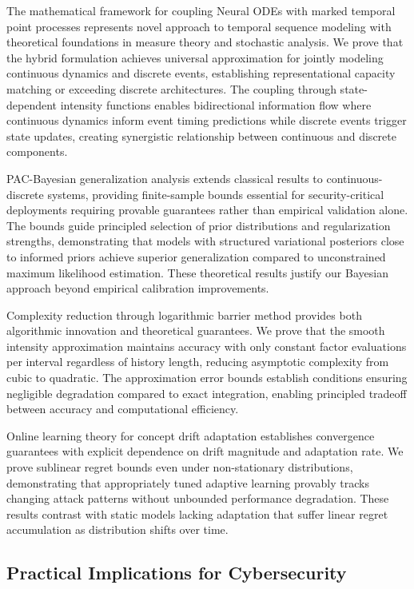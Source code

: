 \documentclass[10pt,journal,compsoc]{IEEEtran}
\begin{document}
The mathematical framework for coupling Neural ODEs with marked temporal point processes represents novel approach to temporal sequence modeling with theoretical foundations in measure theory and stochastic analysis. We prove that the hybrid formulation achieves universal approximation for jointly modeling continuous dynamics and discrete events, establishing representational capacity matching or exceeding discrete architectures. The coupling through state-dependent intensity functions enables bidirectional information flow where continuous dynamics inform event timing predictions while discrete events trigger state updates, creating synergistic relationship between continuous and discrete components.

PAC-Bayesian generalization analysis extends classical results to continuous-discrete systems, providing finite-sample bounds essential for security-critical deployments requiring provable guarantees rather than empirical validation alone. The bounds guide principled selection of prior distributions and regularization strengths, demonstrating that models with structured variational posteriors close to informed priors achieve superior generalization compared to unconstrained maximum likelihood estimation. These theoretical results justify our Bayesian approach beyond empirical calibration improvements.

Complexity reduction through logarithmic barrier method provides both algorithmic innovation and theoretical guarantees. We prove that the smooth intensity approximation maintains accuracy with only constant factor evaluations per interval regardless of history length, reducing asymptotic complexity from cubic to quadratic. The approximation error bounds establish conditions ensuring negligible degradation compared to exact integration, enabling principled tradeoff between accuracy and computational efficiency.

Online learning theory for concept drift adaptation establishes convergence guarantees with explicit dependence on drift magnitude and adaptation rate. We prove sublinear regret bounds even under non-stationary distributions, demonstrating that appropriately tuned adaptive learning provably tracks changing attack patterns without unbounded performance degradation. These results contrast with static models lacking adaptation that suffer linear regret accumulation as distribution shifts over time.

\subsection{Practical Implications for Cybersecurity}
\end{document}

